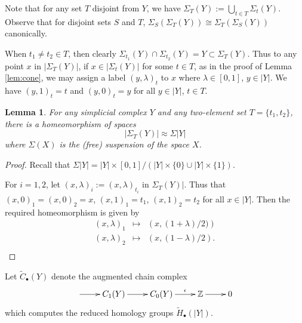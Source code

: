 \documentclass[12pt]{amsart}
\newtheorem{lem}{Lemma}[section]
\theoremstyle{definition}
\newcommand{\Z}{\Bbb{Z}}
\newcommand{\<}{\langle}
\renewcommand{\>}{\rangle}
\newcommand{\mc}[2]{\Sigma_{#1}(#2)}
\begin{document}
Note that for any set $T$ disjoint from $Y$, we have $\mc{T}{Y}:=\bigcup_{t\in T} \mc{t}{Y}$. Observe that for disjoint sets $S$ and $T$, $\mc{S}{\mc{T}{Y}}\cong\mc{T}{\mc{S}{Y}}$
canonically.

When $t_1\not=t_2\in T$, then clearly 
 $\mc{t_1}{Y}\cap \mc{t_2}{Y}=Y\subset \mc{T}{Y}$.
Thus to any point $x$ in  $|\mc{T}{Y}|$, if $x\in |\mc{t}{Y}|$ for some $t\in T$,  as in the proof of Lemma \ref{lem:cone}, we may assign a label $(y,\lambda)_t$ to $x$ where $\lambda\in [0,1]$, $y\in |Y|$. We have $(y,1)_t=t$  and
 $(y,0)_t=y$ for all 
$y\in |Y|$, $t\in T$.


\begin{lem}\label{lem:susp} For any simplicial complex $Y$ and any two-element set $T=\{ t_1,t_2\}$, there is a homeomorphism of spaces
\[
\left| \mc{T}{Y}\right| \approx \Sigma |Y|
\]
where $\Sigma (X)$ is the (free) suspension of the space $X$.
\end{lem}

\begin{proof}
Recall that $\Sigma|Y|=|Y|\times [0,1]/(|Y|\times \{ 0\}\cup |Y|\times \{ 1\})$. 

For $i=1,2$, let $(x,\lambda)_i:=(x,\lambda)_{t_i}$ in $\mc{T}{Y}|$. Thus that $(x,0)_1=(x,0)_2=x$, $(x,1)_1=t_1$, $(x,1)_2=t_2$ for all $x\in |Y|$. Then the required homeomorphism 
is given by
\begin{eqnarray*}
(x,\lambda)_1&\mapsto & \left( x, (1+\lambda)/2)\right)\\
(x,\lambda)_2&\mapsto & \left(x,(1-\lambda)/2\right).\\
\end{eqnarray*}
\end{proof}



 Let $\tilde{C}_\bullet(Y)$ denote the augmented chain complex
\[
\xymatrix{
\ar[r]&C_1(Y)\ar[r]&C_0(Y)\ar^-{\epsilon}[r]& \Z\ar[r]&0\\
}
\]
which computes the reduced homology groups $\tilde{H}_\bullet(|Y|)$. 
\end{document}
